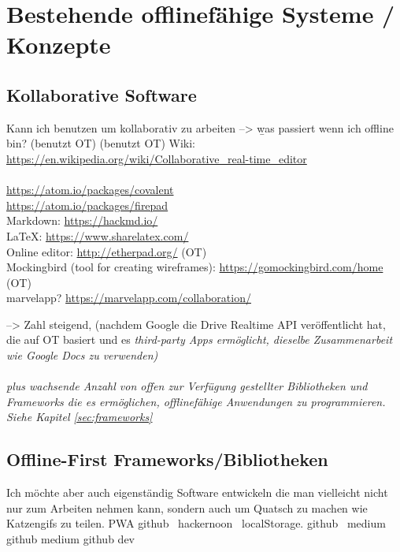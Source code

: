 \chapter{\label{chap:state}Bestehende offlinefähige Systeme / Konzepte}
%
%
\section{Kollaborative Software}
Kann ich benutzen um kollaborativ zu arbeiten --> \b{was passiert wenn ich offline bin?}
(benutzt OT)
(benutzt OT)
Wiki: \url{https://en.wikipedia.org/wiki/Collaborative_real-time_editor}\\\\
\url{https://atom.io/packages/covalent}\\
\url{https://atom.io/packages/firepad}\\
Markdown: \url{https://hackmd.io/}\\
LaTeX: \url{https://www.sharelatex.com/}\\
Online editor: \url{http://etherpad.org/} (OT)\\
Mockingbird (tool for creating wireframes): \url{https://gomockingbird.com/home} (OT)\\
marvelapp? \url{https://marvelapp.com/collaboration/}

--> Zahl steigend, (nachdem Google die Drive Realtime API veröffentlicht hat, die auf \gls{OT} basiert und es \it{third-party Apps} ermöglicht, dieselbe Zusammenarbeit wie Google Docs zu verwenden)\\\\
\b{plus} wachsende Anzahl von offen zur Verfügung gestellter Bibliotheken und Frameworks die es ermöglichen, offlinefähige Anwendungen zu programmieren. Siehe Kapitel \ref{sec:frameworks}
%
%
\section{\label{sec:frameworks}Offline-First Frameworks/Bibliotheken}
Ich möchte aber auch eigenständig Software entwickeln die man vielleicht nicht nur zum Arbeiten nehmen kann, sondern auch um Quatsch zu machen wie Katzengifs zu teilen.
\Gls{PWA}
%
%
%
%
\cite{realm}
%
%
github~\cite{redux-offline-gh}
hackernoon~\cite{redux-offline}
%
%
localStorage. github~\cite{redux-persist-gh} medium~\cite{redux-persist}
%
%
github \cite{rn-offline-gh} medium\cite{rn-offline-medium}
%
%
github\cite{webpack-gh}
dev\cite{webpack-dev}
%
%
\cite{hoodie}